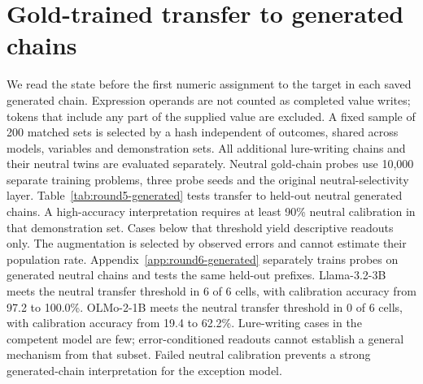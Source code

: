 \section{Gold-trained transfer to generated chains}
\label{app:round5-generated}
We read the state before the first numeric assignment to the target in each saved generated chain. Expression operands are not counted as completed value writes; tokens that include any part of the supplied value are excluded. A fixed sample of 200 matched sets is selected by a hash independent of outcomes, shared across models, variables and demonstration sets. All additional lure-writing chains and their neutral twins are evaluated separately.
Neutral gold-chain probes use 10,000 separate training problems, three probe seeds and the original neutral-selectivity layer. Table~\ref{tab:round5-generated} tests transfer to held-out neutral generated chains. A high-accuracy interpretation requires at least 90\% neutral calibration in that demonstration set. Cases below that threshold yield descriptive readouts only. The augmentation is selected by observed errors and cannot estimate their population rate. Appendix~\ref{app:round6-generated} separately trains probes on generated neutral chains and tests the same held-out prefixes.
Llama-3.2-3B meets the neutral transfer threshold in 6 of 6 cells, with calibration accuracy from 97.2 to 100.0\%.
OLMo-2-1B meets the neutral transfer threshold in 0 of 6 cells, with calibration accuracy from 19.4 to 62.2\%.
Lure-writing cases in the competent model are few; error-conditioned readouts cannot establish a general mechanism from that subset. Failed neutral calibration prevents a strong generated-chain interpretation for the exception model.
